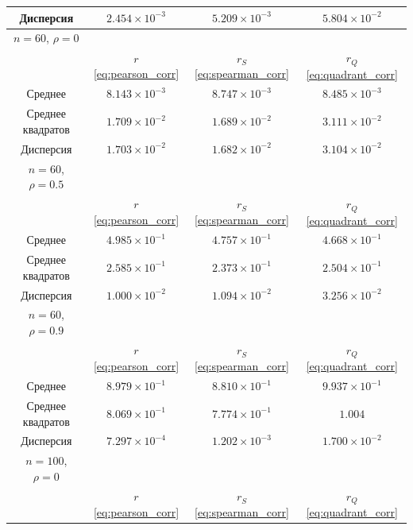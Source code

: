 \documentclass[12pt,a4paper]{article}
\begin{document}
\begin{table}[htbp!]
\begin{tabular}{ |c|c|c|c| }
			\hline
			Дисперсия & \( 2.454 \times 10^{-3} \) &
			\( 5.209 \times 10^{-3} \) & \( 5.804 \times 10^{-2} \) \\
			\hline
			\hline
			\( n = 60 \), \( \rho = 0 \) & & & \\
			\hline
			& \( r \) \eqref{eq:pearson_corr} & \( r_S \) \eqref{eq:spearman_corr} &
			\( r_Q \) \eqref{eq:quadrant_corr} \\
			\hline
			Среднее & \( 8.143 \times 10^{-3} \) & \( 8.747 \times 10^{-3} \) &
			\( 8.485 \times 10^{-3} \) \\
			\hline
			Среднее квадратов & \( 1.709 \times 10^{-2} \) &
			\( 1.689 \times 10^{-2} \) & \( 3.111 \times 10^{-2} \) \\
			\hline
			Дисперсия & \( 1.703 \times 10^{-2} \) &
			\( 1.682 \times 10^{-2} \) & \( 3.104 \times 10^{-2} \) \\
			\hline
			\hline
			\( n = 60 \), \( \rho = 0.5 \) & & & \\
			\hline
			& \( r \) \eqref{eq:pearson_corr} & \( r_S \) \eqref{eq:spearman_corr} &
			\( r_Q \) \eqref{eq:quadrant_corr} \\
			\hline
			Среднее & \( 4.985 \times 10^{-1} \) & \( 4.757 \times 10^{-1} \) &
			\( 4.668 \times 10^{-1} \) \\
			\hline
			Среднее квадратов & \( 2.585 \times 10^{-1} \) &
			\( 2.373 \times 10^{-1} \) & \( 2.504 \times 10^{-1} \) \\
			\hline
			Дисперсия & \( 1.000 \times 10^{-2} \) &
			\( 1.094 \times 10^{-2} \) & \( 3.256 \times 10^{-2} \) \\
			\hline
			\hline
			\( n = 60 \), \( \rho = 0.9 \) & & & \\
			\hline
			& \( r \) \eqref{eq:pearson_corr} & \( r_S \) \eqref{eq:spearman_corr} &
			\( r_Q \) \eqref{eq:quadrant_corr} \\
			\hline
			Среднее & \( 8.979 \times 10^{-1} \) & \( 8.810 \times 10^{-1} \) &
			\( 9.937 \times 10^{-1} \) \\
			\hline
			Среднее квадратов & \( 8.069 \times 10^{-1} \) &
			\( 7.774 \times 10^{-1} \) & \( 1.004 \) \\
			\hline
			Дисперсия & \( 7.297 \times 10^{-4} \) &
			\( 1.202 \times 10^{-3} \) & \( 1.700 \times 10^{-2} \) \\
			\hline
			\hline
			\( n = 100 \), \( \rho = 0 \) & & & \\
			\hline
			& \( r \) \eqref{eq:pearson_corr} & \( r_S \) \eqref{eq:spearman_corr} &
			\( r_Q \) \eqref{eq:quadrant_corr} \\

\end{tabular}
\end{table}
\end{document}
